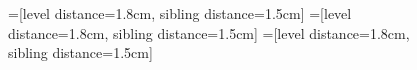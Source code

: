 \begin{figure}[t]
  \centering
  =[level distance=1.8cm, sibling distance=1.5cm]
  =[level distance=1.8cm, sibling distance=1.5cm]
  =[level distance=1.8cm, sibling distance=1.5cm]

  \hspace{-0.175\linewidth}%
  \begin{subfigure}[b]{0.25\linewidth}
    \begin{subfigure}[t]{\columnwidth}
      \centering
      \caption{}
    \end{subfigure} \\\vspace{3em}


\end{subfigure}
\end{figure}
